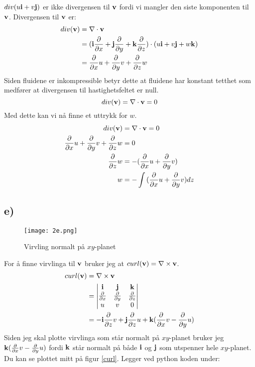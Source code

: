 \documentclass[a4paper,12pt,norsk]{article}
\begin{document}
$div(u\bold{i} + v\bold{j})$ er ikke divergensen til $\bold{v}$ fordi vi mangler den siste komponenten til $\bold{v}$. Divergensen til $\bold{v}$ er: 
\begin{align*}
div(\bold{v}) &= \nabla \cdot \bold{v}\\ 
&= (\bold{i}\frac{\partial}{\partial{x}} + \bold{j}\frac{\partial}{\partial{y}}+ \bold{k}\frac{\partial}{\partial{z}}) \cdot (u\bold{i} + v\bold{j} + w\bold{k})\\
&= \frac{\partial}{\partial{x}}u + \frac{\partial}{\partial{y}}v + \frac{\partial}{\partial{z}}w
\end{align*}
Siden fluidene er inkompressible betyr dette at fluidene har konstant tetthet som medfører at divergensen til hastighetsfeltet er null. $$div(\bold{v}) = \nabla \cdot \bold{v} = 0$$
Med dette kan vi nå finne et uttrykk for $w$.
\begin{align*}
div(\bold{v}) &= \nabla \cdot \bold{v} = 0\\
\frac{\partial}{\partial{x}}u + \frac{\partial}{\partial{y}}v + \frac{\partial}{\partial{z}}w &= 0\\
\frac{\partial}{\partial{z}}w &= -(\frac{\partial}{\partial{x}}u + \frac{\partial}{\partial{y}}v)\\
w &= -\int{(\frac{\partial}{\partial{x}}u + \frac{\partial}{\partial{y}}v) dz}
\end{align*}

\subsection*{e)}
\begin{figure}[h!]
\texttt{[image: 2e.png]} 
\caption{Virvling normalt på $xy$-planet}
\label{curl}
\end{figure} 
For å finne virvlinga til $\bold{v}$ bruker jeg at $curl(\bold{v}) = \nabla \times \bold{v}$. 
\begin{align*}
curl(\bold{v}) &= \nabla \times \bold{v} \\
&= \begin{vmatrix}
\bold{i} & \bold{j} & \bold{k}\\
\frac{\partial}{\partial{x}} & \frac{\partial}{\partial{y}} & \frac{\partial}{\partial{z}}\\
u & v & 0
\end{vmatrix} \\
&= -\bold{i}\frac{\partial}{\partial{z}}v + \bold{j}\frac{\partial}{\partial{z}}u + \bold{k}(\frac{\partial}{\partial{x}}v- \frac{\partial}{\partial{y}}u)
\end{align*}
Siden jeg skal plotte virvlinga som står normalt på $xy$-planet bruker jeg $\bold{k}(\frac{\partial}{\partial{x}}v- \frac{\partial}{\partial{y}}u)$ fordi $\bold{k}$ står normalt på både $\bold{i}$ og $\bold{j}$ som utspenner hele $xy$-planet.\\
Du kan se plottet mitt på figur \vref{curl}. Legger ved python koden under: 

\end{document}
